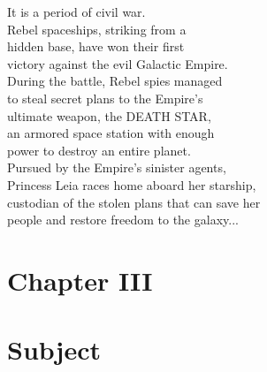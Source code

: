 \documentclass[12pt]{article}
\begin{document}
\begin{flushleft}
    It is a period of civil war.\\
    Rebel spaceships, striking from a\\
    hidden base, have won their first\\
    victory against the evil Galactic Empire.\\[1em]

    During the battle, Rebel spies managed\\
    to steal secret plans to the Empire's\\
    ultimate weapon, the DEATH STAR,\\
    an armored space station with enough\\
    power to destroy an entire planet.\\[1em]

    Pursued by the Empire's sinister agents,\\
    Princess Leia races home aboard her starship,\\
    custodian of the stolen plans that can save her\\
    people and restore freedom to the galaxy...
    \end{flushleft}

\newpage

\section*{\LARGE Chapter III}
\section*{\LARGE Subject}

\end{document}
